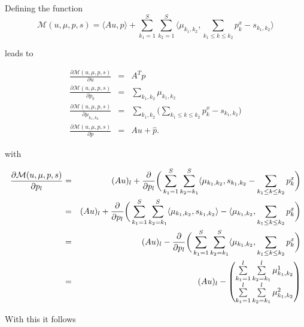     Defining the function
    $$
        \mathcal{M}(u, \mu, p, s) = \langle Au, p \rangle + \sum_{k_{1} = 1}^{S} \sum_{k_{2} = 1}^{S} \langle \mu_{k_{1}, k_{2}}, \sum_{k_{1} \le k \le k_{2}} p^{x}_{k} - s_{k_{1}, k_{2}} \rangle
    $$

    leads to

        \begin{eqnarray}
            \frac{\partial \mathcal{M}(u, \mu, p, s)}{\partial u} &=& A^{T} p \\
            \frac{\partial \mathcal{M}(u, \mu, p, s)}{\partial p_{k}} &=& \sum_{k_{1}, k_{2}} \mu_{k_{1}, k_{2}} \\
            \frac{\partial \mathcal{M}(u, \mu, p, s)}{\partial \mu_{k_{1}, k_{2}}} &=& \sum_{k_{1}, k_{2}} \bigg( \sum_{k_{1} \le k \le k_{2}} p^{x}_{k} - s_{k_{1}, k_{2}} \bigg) \\
            \frac{\partial \mathcal{M}(u, \mu, p, s)}{\partial p} &=& Au + \hat{p}.
        \end{eqnarray}

    with

        \begin{eqnarray}
            \frac{\partial \mathcal{M}(u, \mu, p, s)}{\partial p_{l}} &=& (Au)_{l} + \frac{\partial}{\partial p_{l}} \bigg(\sum_{k_{1} = 1}^{S} \sum_{k_{2} = k_{1}}^{S} \langle \mu_{k_{1}, k_{2}}, s_{k_{1}, k_{2}} - \sum_{k_{1} \le k \le k_{2}} p^{x}_{k} \bigg) \notag \\
            &=& (Au)_{l} + \frac{\partial}{\partial p_{l}} \bigg(\sum_{k_{1} = 1}^{S} \sum_{k_{2} = k_{1}}^{S} \langle \mu_{k_{1}, k_{2}}, s_{k_{1}, k_{2}} \rangle - \langle \mu_{k_{1}, k_{2}}, \sum_{k_{1} \le k \le k_{2}} p^{x}_{k} \bigg) \notag \\
            &=& (Au)_{l} - \frac{\partial}{\partial p_{l}} \bigg(\sum_{k_{1} = 1}^{S} \sum_{k_{2} = k_{1}}^{S} \langle \mu_{k_{1}, k_{2}}, \sum_{k_{1} \le k \le k_{2}} p^{x}_{k} \bigg) \notag \\
            &=& (Au)_{l} - 
                \begin{pmatrix}
                    \sum\limits_{k_{1} = 1}^{l} \sum\limits_{k_{2} = k_{1}}^{l} \mu_{k_{1}, k_{2}}^{1} \\
                    \sum\limits_{k_{1} = 1}^{l} \sum\limits_{k_{2} = k_{1}}^{l} \mu_{k_{1}, k_{2}}^{2}
                \end{pmatrix}
        \end{eqnarray}

    With this it follows


